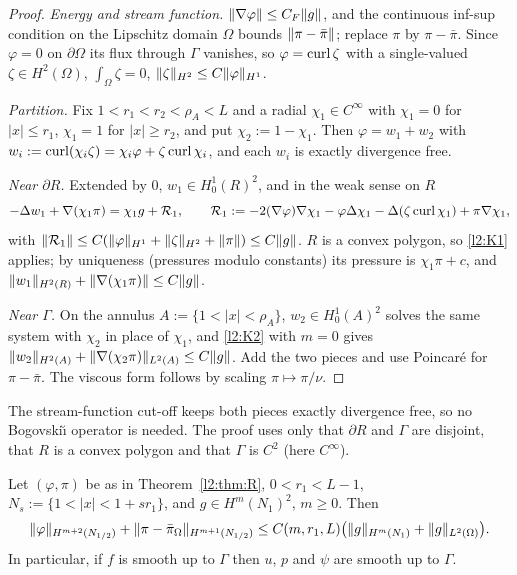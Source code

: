 \begin{proof}
\emph{Energy and stream function.} $\lVert \nabla\varphi\rVert\le C_F\lVert g\rVert$, and the continuous inf-sup condition on the Lipschitz domain $\Omega$ bounds $\lVert \pi-\bar\pi\rVert$; replace $\pi$ by $\pi-\bar\pi$. Since $\varphi=0$ on $\partial\Omega$ its flux through $\Gamma$ vanishes, so $\varphi=\operatorname{curl}\zeta$ with a single-valued $\zeta\in H^2(\Omega)$, $\int_\Omega\zeta=0$, $\lVert \zeta\rVert_{H^2}\le C\lVert \varphi\rVert_{H^1}$.

\emph{Partition.} Fix $1<r_1<r_2<\rho_A<L$ and a radial $\chi_1\in C^\infty$ with $\chi_1=0$ for $|x|\le r_1$, $\chi_1=1$ for $|x|\ge r_2$, and put $\chi_2:=1-\chi_1$. Then $\varphi=w_1+w_2$ with $w_i:=\operatorname{curl}(\chi_i\zeta)=\chi_i\varphi+\zeta\operatorname{curl}\chi_i$, and each $w_i$ is exactly divergence free.

\emph{Near $\partial R$.} Extended by $0$, $w_1\in H^1_0(R)^2$, and in the weak sense on $R$
\[
-\Delta w_1+\nabla(\chi_1\pi)=\chi_1g+\mathcal R_1,\qquad \mathcal R_1:=-2(\nabla\varphi)\nabla\chi_1-\varphi\Delta\chi_1-\Delta(\zeta\operatorname{curl}\chi_1)+\pi\nabla\chi_1,
\]
with $\lVert \mathcal R_1\rVert\le C(\lVert \varphi\rVert_{H^1}+\lVert \zeta\rVert_{H^2}+\lVert \pi\rVert)\le C\lVert g\rVert$. $R$ is a convex polygon, so \ref{l2:K1} applies; by uniqueness (pressures modulo constants) its pressure is $\chi_1\pi+c$, and $\lVert w_1\rVert_{H^2(R)}+\lVert \nabla(\chi_1\pi)\rVert\le C\lVert g\rVert$.

\emph{Near $\Gamma$.} On the annulus $A:=\{1<|x|<\rho_A\}$, $w_2\in H^1_0(A)^2$ solves the same system with $\chi_2$ in place of $\chi_1$, and \ref{l2:K2} with $m=0$ gives $\lVert w_2\rVert_{H^2(A)}+\lVert \nabla(\chi_2\pi)\rVert_{L^2(A)}\le C\lVert g\rVert$. Add the two pieces and use Poincar\'e for $\pi-\bar\pi$. The viscous form follows by scaling $\pi\mapsto\pi/\nu$.
\end{proof}

The stream-function cut-off keeps both pieces exactly divergence free, so no Bogovski\u\i{} operator is needed. The proof uses only that $\partial R$ and $\Gamma$ are disjoint, that $R$ is a convex polygon and that $\Gamma$ is $C^2$ (here $C^\infty$).

\begin{proposition}\label{l2:prop:loc}
Let $(\varphi,\pi)$ be as in Theorem~\ref{l2:thm:R}, $0<r_1<L-1$, $N_s:=\{1<|x|<1+sr_1\}$, and $g\in H^m(N_1)^2$, $m\ge0$. Then
\[
\lVert \varphi\rVert_{H^{m+2}(N_{1/2})}+\lVert \pi-\bar\pi_\Omega\rVert_{H^{m+1}(N_{1/2})}\le C(m,r_1,L)\bigl(\lVert g\rVert_{H^m(N_1)}+\lVert g\rVert_{L^2(\Omega)}\bigr).
\]
In particular, if $f$ is smooth up to $\Gamma$ then $u$, $p$ and $\psi$ are smooth up to $\Gamma$.
\end{proposition}

